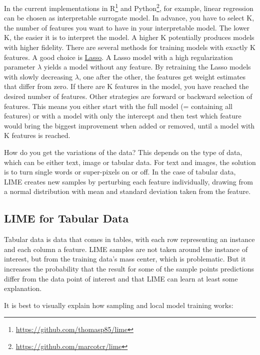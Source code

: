 \documentclass[12pt,]{krantz}
\renewcommand{\href}[2]{#2\footnote{\url{#1}}}
\begin{document}
In the current implementations in
\href{https://github.com/thomasp85/lime}{R} and
\href{https://github.com/marcotcr/lime}{Python}, for example, linear
regression can be chosen as interpretable surrogate model. In advance,
you have to select K, the number of features you want to have in your
interpretable model. The lower K, the easier it is to interpret the
model. A higher K potentially produces models with higher fidelity.
There are several methods for training models with exactly K features. A
good choice is \protect\hyperlink{lasso}{Lasso}. A Lasso model with a
high regularization parameter \(\lambda\) yields a model without any
feature. By retraining the Lasso models with slowly decreasing
\(\lambda\), one after the other, the features get weight estimates that
differ from zero. If there are K features in the model, you have reached
the desired number of features. Other strategies are forward or backward
selection of features. This means you either start with the full model
(= containing all features) or with a model with only the intercept and
then test which feature would bring the biggest improvement when added
or removed, until a model with K features is reached.

How do you get the variations of the data? This depends on the type of
data, which can be either text, image or tabular data. For text and
images, the solution is to turn single words or super-pixels on or off.
In the case of tabular data, LIME creates new samples by perturbing each
feature individually, drawing from a normal distribution with mean and
standard deviation taken from the feature.

\subsection{LIME for Tabular Data}\label{lime-for-tabular-data}

Tabular data is data that comes in tables, with each row representing an
instance and each column a feature. LIME samples are not taken around
the instance of interest, but from the training data's mass center,
which is problematic. But it increases the probability that the result
for some of the sample points predictions differ from the data point of
interest and that LIME can learn at least some explanation.

It is best to visually explain how sampling and local model training
works:
\end{document}
